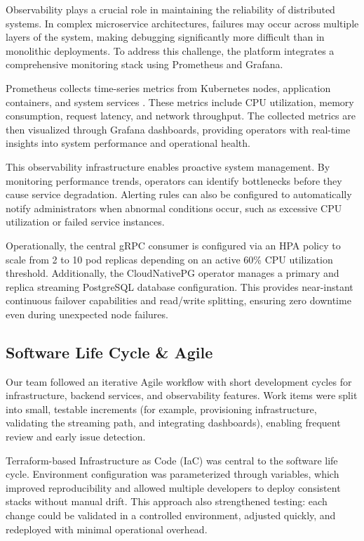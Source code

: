 \documentclass[conference]{IEEEtran}
\begin{document}
Observability plays a crucial role in maintaining the reliability of distributed systems. In complex microservice architectures, failures may occur across multiple layers of the system, making debugging significantly more difficult than in monolithic deployments. To address this challenge, the platform integrates a comprehensive monitoring stack using Prometheus and Grafana.

Prometheus collects time-series metrics from Kubernetes nodes, application containers, and system services \cite{prometheus2018}. These metrics include CPU utilization, memory consumption, request latency, and network throughput. The collected metrics are then visualized through Grafana dashboards, providing operators with real-time insights into system performance and operational health.

This observability infrastructure enables proactive system management. By monitoring performance trends, operators can identify bottlenecks before they cause service degradation. Alerting rules can also be configured to automatically notify administrators when abnormal conditions occur, such as excessive CPU utilization or failed service instances.

Operationally, the central gRPC consumer is configured via an HPA policy to scale from 2 to 10 pod replicas depending on an active 60\% CPU utilization threshold. Additionally, the CloudNativePG operator manages a primary and replica streaming PostgreSQL database configuration. This provides near-instant continuous failover capabilities and read/write splitting, ensuring zero downtime even during unexpected node failures.
\subsection{Software Life Cycle \& Agile}
Our team followed an iterative Agile workflow with short development cycles for infrastructure, backend services, and observability features. Work items were split into small, testable increments (for example, provisioning infrastructure, validating the streaming path, and integrating dashboards), enabling frequent review and early issue detection.

Terraform-based Infrastructure as Code (IaC) was central to the software life cycle. Environment configuration was parameterized through variables, which improved reproducibility and allowed multiple developers to deploy consistent stacks without manual drift. This approach also strengthened testing: each change could be validated in a controlled environment, adjusted quickly, and redeployed with minimal operational overhead.
\end{document}
